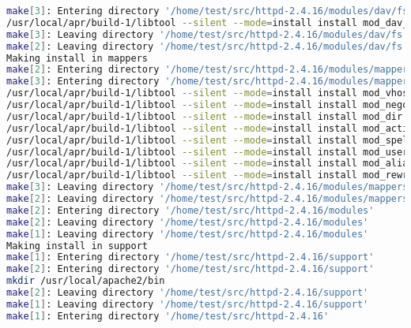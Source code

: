 \begin{lstlisting}[language=bash]
make[3]: Entering directory '/home/test/src/httpd-2.4.16/modules/dav/fs'
/usr/local/apr/build-1/libtool --silent --mode=install install mod_dav_fs.la /usr/local/apache2/modules/
make[3]: Leaving directory '/home/test/src/httpd-2.4.16/modules/dav/fs'
make[2]: Leaving directory '/home/test/src/httpd-2.4.16/modules/dav/fs'
Making install in mappers
make[2]: Entering directory '/home/test/src/httpd-2.4.16/modules/mappers'
make[3]: Entering directory '/home/test/src/httpd-2.4.16/modules/mappers'
/usr/local/apr/build-1/libtool --silent --mode=install install mod_vhost_alias.la /usr/local/apache2/modules/
/usr/local/apr/build-1/libtool --silent --mode=install install mod_negotiation.la /usr/local/apache2/modules/
/usr/local/apr/build-1/libtool --silent --mode=install install mod_dir.la /usr/local/apache2/modules/
/usr/local/apr/build-1/libtool --silent --mode=install install mod_actions.la /usr/local/apache2/modules/
/usr/local/apr/build-1/libtool --silent --mode=install install mod_speling.la /usr/local/apache2/modules/
/usr/local/apr/build-1/libtool --silent --mode=install install mod_userdir.la /usr/local/apache2/modules/
/usr/local/apr/build-1/libtool --silent --mode=install install mod_alias.la /usr/local/apache2/modules/
/usr/local/apr/build-1/libtool --silent --mode=install install mod_rewrite.la /usr/local/apache2/modules/
make[3]: Leaving directory '/home/test/src/httpd-2.4.16/modules/mappers'
make[2]: Leaving directory '/home/test/src/httpd-2.4.16/modules/mappers'
make[2]: Entering directory '/home/test/src/httpd-2.4.16/modules'
make[2]: Leaving directory '/home/test/src/httpd-2.4.16/modules'
make[1]: Leaving directory '/home/test/src/httpd-2.4.16/modules'
Making install in support
make[1]: Entering directory '/home/test/src/httpd-2.4.16/support'
make[2]: Entering directory '/home/test/src/httpd-2.4.16/support'
mkdir /usr/local/apache2/bin
make[2]: Leaving directory '/home/test/src/httpd-2.4.16/support'
make[1]: Leaving directory '/home/test/src/httpd-2.4.16/support'
make[1]: Entering directory '/home/test/src/httpd-2.4.16'


\end{lstlisting}
